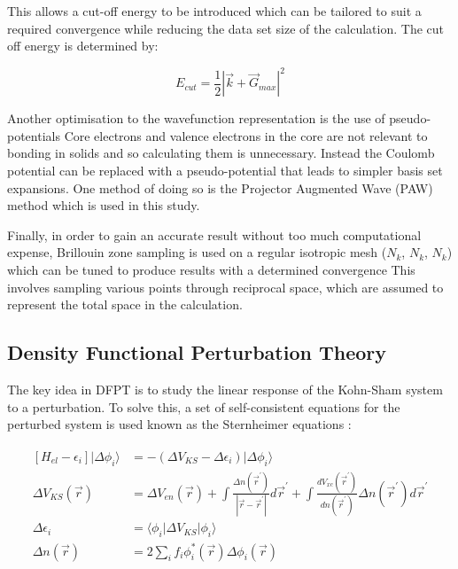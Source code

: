 \documentclass[a4paper,12pt]{article}
\begin{document}
\noindent This allows a cut-off energy to be introduced which can be tailored to suit a required convergence while reducing the data set size of the calculation. The cut off energy is determined by:

\begin{equation}
E_{cut}=\frac{1}{2}|\vec{k}+\vec{G}_{max}|^2
\end{equation}

\bigskip
\noindent Another optimisation to the wavefunction representation is the use of pseudo-potentials Core electrons and valence electrons in the core are not relevant to bonding in solids and so calculating them is unnecessary. Instead the Coulomb potential can be replaced with a pseudo-potential that leads to simpler basis set expansions. One method of doing so is the Projector Augmented Wave (PAW) method which is used in this study.

\bigskip
\noindent Finally, in order to gain an accurate result without too much computational expense, Brillouin zone sampling is used on a regular isotropic mesh ($N_k$, $N_k$, $N_k$) which can be tuned to produce results with a determined convergence This involves sampling various points through reciprocal space, which are assumed to represent the total space in the calculation.

\subsection{Density Functional Perturbation Theory}
The key idea in DFPT is to study the linear response of the Kohn-Sham system to a perturbation. To solve this, a set of self-consistent equations for the perturbed system is used known as the Sternheimer equations \cite{sternheimer}:

\begin{align}
\begin{split}
\left[ H_{el} - \epsilon_i \right] |\Delta\phi_i\rangle &= -\left( \Delta V_{KS} - \Delta\epsilon_i \right)|\Delta\phi_i\rangle \\
\Delta V_{KS}(\vec{r}) &= \Delta V_{en}(\vec{r}) + \int\frac{\Delta n(\vec{r}^{\prime})}{|\vec{r}-\vec{r}^{\prime}|}d\vec{r}^{\prime} + \int\frac{dV_{xc}(\vec{r}^{\prime})}{dn(\vec{r}^{\prime})}\Delta n(\vec{r}^{\prime})d\vec{r}^{\prime} \\
\Delta\epsilon_i &= \langle\phi_i|\Delta V_{KS}|\phi_i\rangle \\
\Delta n(\vec{r}) &= 2\sum_{i}f_i\phi_i^*(\vec{r})\Delta\phi_i(\vec{r})
\end{split}
\end{align}
\end{document}
